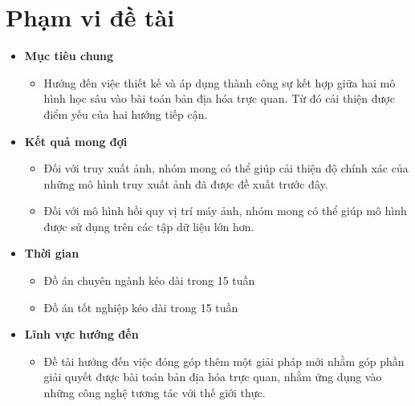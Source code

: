 \section{Phạm vi đề tài}
\begin{itemize}
    \item \textbf{Mục tiêu chung} 
    \begin{itemize}
        \item Hướng đến việc thiết kế và áp dụng thành công sự kết hợp giữa hai mô hình học sâu vào bài toán bản địa hóa trực quan. Từ đó cải thiện được điểm yếu của hai hướng tiếp cận.
    \end{itemize} 
    \item \textbf{Kết quả mong đợi}
    \begin{itemize}
        \item Đối với truy xuất ảnh, nhóm mong có thể giúp cải thiện độ chính xác của những mô hình truy xuất ảnh đã được đề xuất trước đây.
        \item Đối với mô hình hồi quy vị trí máy ảnh, nhóm mong có thể giúp mô hình được sử dụng trên các tập dữ liệu lớn hơn.
    \end{itemize}
    \item \textbf{Thời gian}
    \begin{itemize}
        \item Đồ án chuyên ngành kéo dài trong 15 tuần
        \item Đồ án tốt nghiệp kéo dài trong 15 tuần
    \end{itemize}
    \item \textbf{Lĩnh vực hướng đến}
    \begin{itemize}
        \item Đề tài hướng đến việc đóng góp thêm một giải pháp mới nhằm góp phần giải quyết được bài toán bản địa hóa trực quan, nhằm ứng dụng vào những công nghệ tương tác với thế giới thực.
    \end{itemize}
    
\end{itemize}

